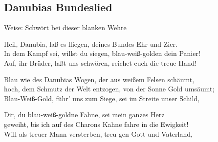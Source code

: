 
\subsection*{Danubias Bundeslied}
%
%

\hfill%
Weise: Schwört bei dieser blanken Wehre%

\thestrophe Heil, Danubia, laß es fliegen, deines Bundes Ehr und Zier. \\
In dem Kampf sei, willst du siegen, blau-weiß-golden dein Panier! \\
Auf, ihr Brüder, laßt uns schwören, reichet euch die treue Hand! \\

\thestrophe Blau wie des Danubias Wogen, der aus weißem Felsen schäumt, \\
hoch, dem Schmutz der Welt entzogen, von der Sonne Gold umsäumt; \\
Blau-Weiß-Gold, führ' uns zum Siege, sei im Streite unser Schild, \\

\thestrophe Dir, du blau-weiß-goldne Fahne, sei mein ganzes Herz \\
geweiht, bis ich auf des Charons Kahne fahre in die Ewigkeit! \\
Will als treuer Mann versterben, treu gen Gott und Vaterland, \\
